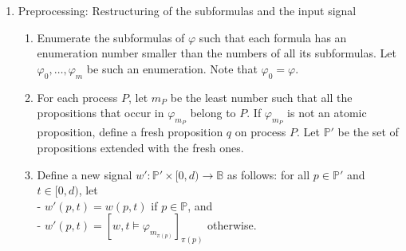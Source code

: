 \documentclass[envcountsame, runningheads]{llncs}
\newcommand{\B}{\mathbb{B}}
\newcommand{\?}{\text{?}}
\begin{document}
	\begin{enumerate}
		\item Preprocessing: Restructuring of the subformulas and the input signal
		\begin{enumerate}[label=\arabic*.]
			\item Enumerate the subformulas of $\varphi$ such that each formula has an enumeration number smaller than the numbers of all its subformulas. Let $\varphi_0, \ldots, \varphi_m$ be such an enumeration. Note that $\varphi_0 = \varphi$.
			\item For each process $P$, let $m_P$ be the least number such that all the propositions that occur in $\varphi_{m_P}$ belong to $P$. If $\varphi_{m_P}$ is not an atomic proposition, define a fresh proposition $q$ on process $P$. Let $\mathbb{P}'$ be the set of propositions extended with the fresh ones.
			\item Define a new signal $w' : \mathbb{P}' \times [0,d) \to \B$ as follows: for all $p \in \mathbb{P}'$ and $t \in [0,d)$, let \\
			- $w'(p,t) = w(p,t)$ if $p \in \mathbb{P}$, and\\
			- $w'(p,t) = [w,t \models \varphi_{m_{\pi(p)}}]_{\pi(p)}$ otherwise.
		\end{enumerate}
		

\end{enumerate}
\end{document}
